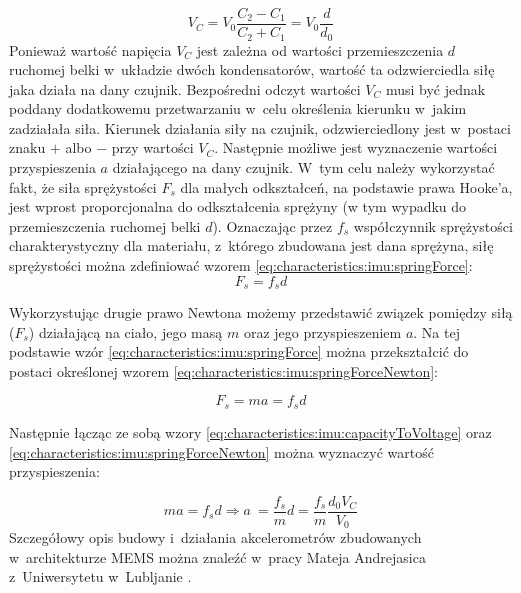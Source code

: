 \begin{equation}
	V_C = V_0 \frac{C_2-C_1}{C_2+C_1} = V_0\frac{d}{d_0}
	\label{eq:characteristics:imu:capacityToVoltage}
\end{equation}																																												
Ponieważ wartość napięcia $V_C$ jest zależna od wartości przemieszczenia $d$ ruchomej belki w~układzie dwóch kondensatorów, wartość ta odzwierciedla siłę jaka działa na dany czujnik. Bezpośredni odczyt wartości $V_C$ musi być jednak poddany dodatkowemu przetwarzaniu w~celu określenia kierunku w~jakim zadziałała siła. Kierunek działania siły na czujnik, odzwierciedlony jest w~postaci znaku $+$ albo $-$ przy wartości $V_C$. Następnie możliwe jest wyznaczenie wartości przyspieszenia $a$ działającego na dany czujnik. W~tym celu należy wykorzystać fakt, że siła sprężystości $F_s$ dla małych odkształceń, na podstawie prawa Hooke'a, jest wprost proporcjonalna do odkształcenia sprężyny (w tym wypadku do przemieszczenia ruchomej belki $d$). Oznaczając przez $f_s$ współczynnik sprężystości charakterystyczny dla materiału, z~którego zbudowana jest dana sprężyna, siłę sprężystości można zdefiniować wzorem \ref{eq:characteristics:imu:springForce}:																																											
\begin{equation}
	F_s = f_s d
	\label{eq:characteristics:imu:springForce}
\end{equation}	
																																	
Wykorzystując drugie prawo Newtona możemy przedstawić związek pomiędzy siłą ($F_s$) działającą na ciało, jego masą $m$ oraz jego przyspieszeniem $a$. Na tej podstawie wzór \ref{eq:characteristics:imu:springForce} można przekształcić do postaci określonej wzorem \ref{eq:characteristics:imu:springForceNewton}:
	
\begin{equation}
	F_s = ma = f_s d
	\label{eq:characteristics:imu:springForceNewton}
\end{equation}	
			
Następnie łącząc ze sobą wzory \ref{eq:characteristics:imu:capacityToVoltage} oraz \ref{eq:characteristics:imu:springForceNewton} można wyznaczyć wartość przyspieszenia:
					
\begin{equation}
	ma = f_s d \Rightarrow a~= \frac{f_s}{m} d = \frac{f_s}{m} \frac{d_0 V_C}{V_0}
	\label{eq:characteristics:imu:acceleration}
\end{equation}																																											
Szczegółowy opis budowy i~działania akcelerometrów zbudowanych w~architekturze MEMS można znaleźć w~pracy Mateja Andrejasica z~Uniwersytetu w~Lubljanie \cite{Andrejasic2008}.																																											

